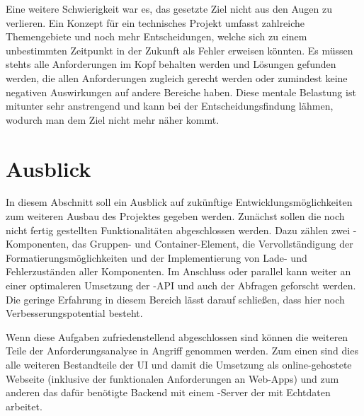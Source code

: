 Eine weitere Schwierigkeit war es, das gesetzte Ziel nicht aus den Augen zu verlieren. Ein Konzept für ein technisches Projekt umfasst zahlreiche Themengebiete und noch mehr Entscheidungen, welche sich zu einem unbestimmten Zeitpunkt in der Zukunft als Fehler erweisen könnten. Es müssen stehts alle Anforderungen im Kopf behalten werden und Lösungen gefunden werden, die allen Anforderungen zugleich gerecht werden oder zumindest keine negativen Auswirkungen auf andere Bereiche haben. Diese mentale Belastung ist mitunter sehr anstrengend und kann bei der Entscheidungsfindung lähmen, wodurch man dem Ziel nicht mehr näher kommt.

\section{Ausblick}
In diesem Abschnitt soll ein Ausblick auf zukünftige Entwicklungsmöglichkeiten zum weiteren Ausbau des Projektes gegeben werden. Zunächst sollen die noch nicht fertig gestellten Funktionalitäten abgeschlossen werden. Dazu zählen zwei -Komponenten, das Gruppen- und Container-Element, die Vervollständigung der Formatierungsmöglichkeiten und der Implementierung von Lade- und Fehlerzuständen aller Komponenten.
Im Anschluss oder parallel kann weiter an einer optimaleren Umsetzung der -API und auch der Abfragen geforscht werden. Die geringe Erfahrung in diesem Bereich lässt darauf schließen, dass hier noch Verbesserungspotential besteht.

Wenn diese Aufgaben zufriedenstellend abgeschlossen sind können die weiteren Teile der Anforderungsanalyse in Angriff genommen werden. Zum einen sind dies alle weiteren Bestandteile der UI und damit die Umsetzung als online-gehostete Webseite (inklusive der funktionalen Anforderungen an Web-Apps) und zum anderen das dafür benötigte Backend mit einem -Server der mit Echtdaten arbeitet.
